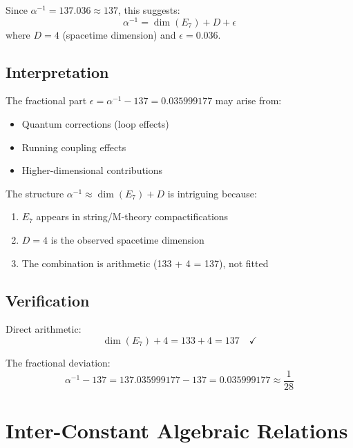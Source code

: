 \documentclass[11pt,a4paper]{article}
\begin{document}
Since $\alpha^{-1} = 137.036 \approx 137$, this suggests:
\begin{equation}
\alpha^{-1} = \dim(E_7) + D + \epsilon
\end{equation}
where $D = 4$ (spacetime dimension) and $\epsilon = 0.036$.

\subsection{Interpretation}

The fractional part $\epsilon = \alpha^{-1} - 137 = 0.035999177$ may arise from:
\begin{itemize}
    \item Quantum corrections (loop effects)
    \item Running coupling effects
    \item Higher-dimensional contributions
\end{itemize}

The structure $\alpha^{-1} \approx \dim(E_7) + D$ is intriguing because:
\begin{enumerate}
    \item $E_7$ appears in string/M-theory compactifications
    \item $D = 4$ is the observed spacetime dimension
    \item The combination is arithmetic (133 + 4 = 137), not fitted
\end{enumerate}

\subsection{Verification}

Direct arithmetic:
\begin{equation}
\dim(E_7) + 4 = 133 + 4 = 137 \quad \checkmark
\end{equation}

The fractional deviation:
\begin{equation}
\alpha^{-1} - 137 = 137.035999177 - 137 = 0.035999177 \approx \frac{1}{28}
\end{equation}

\section{Inter-Constant Algebraic Relations}
\end{document}
